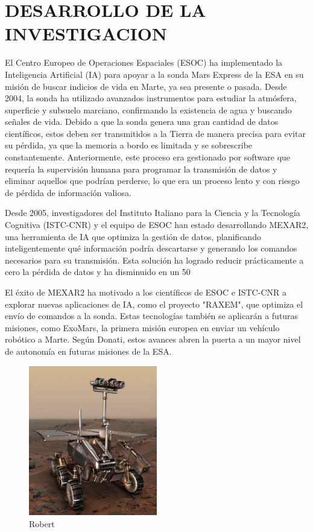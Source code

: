 \documentclass[a4paper]{article}
\begin{document}
\section{DESARROLLO DE LA INVESTIGACION }

El Centro Europeo de Operaciones Espaciales (ESOC) ha implementado la Inteligencia Artificial (IA) para apoyar a la sonda Mars Express de la ESA en su misión de buscar indicios de vida en Marte, ya sea presente o pasada. Desde 2004, la sonda ha utilizado avanzados instrumentos para estudiar la atmósfera, superficie y subsuelo marciano, confirmando la existencia de agua y buscando señales de vida. Debido a que la sonda genera una gran cantidad de datos científicos, estos deben ser transmitidos a la Tierra de manera precisa para evitar su pérdida, ya que la memoria a bordo es limitada y se sobrescribe constantemente. Anteriormente, este proceso era gestionado por software que requería la supervisión humana para programar la transmisión de datos y eliminar aquellos que podrían perderse, lo que era un proceso lento y con riesgo de pérdida de información valiosa.

Desde 2005, investigadores del Instituto Italiano para la Ciencia y la Tecnología Cognitiva (ISTC-CNR) y el equipo de ESOC han estado desarrollando MEXAR2, una herramienta de IA que optimiza la gestión de datos, planificando inteligentemente qué información podría descartarse y generando los comandos necesarios para su transmisión. Esta solución ha logrado reducir prácticamente a cero la pérdida de datos y ha disminuido en un 50%

El éxito de MEXAR2 ha motivado a los científicos de ESOC e ISTC-CNR a explorar nuevas aplicaciones de IA, como el proyecto "RAXEM", que optimiza el envío de comandos a la sonda. Estas tecnologías también se aplicarán a futuras misiones, como ExoMars, la primera misión europea en enviar un vehículo robótico a Marte. Según Donati, estos avances abren la puerta a un mayor nivel de autonomía en futuras misiones de la ESA.


\begin{figure}[h!]
    \centering
    \includegraphics[width=0.5\textwidth]{Exomarsrover_high.jpg}  %
    \caption{Robert}  %
\end{figure}
\end{document}
